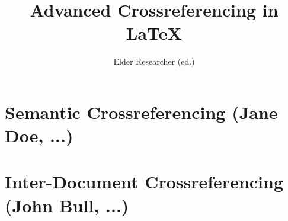 \documentclass{book}
\title{Advanced Crossreferencing in {\LaTeX}}
\author{Elder Researcher (ed.)}
\begin{document}
\maketitle
\tableofcontents
\newpage
\chapter{Semantic Crossreferencing (Jane Doe, ...)}
\newpage
\chapter{Inter-Document Crossreferencing (John Bull, ...)}
 
\end{document}
